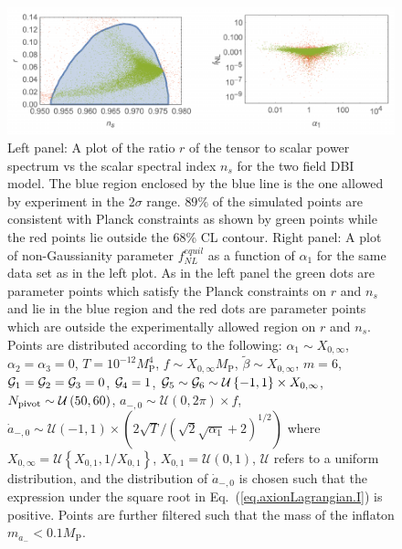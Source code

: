 \documentclass[a4paper,11pt]{article}
\begin{document}
  \begin{figure}
    \centering
    \includegraphics[width=1.0\textwidth]{figs/fig1.pdf}
    \caption{Left panel: A plot of the ratio $r$ of the tensor to scalar power spectrum vs the
      scalar spectral index $n_s$ for the two field DBI model.
      The blue region enclosed by the blue line is the one allowed by experiment in the 2$\sigma$
      range. $89\%$ of the simulated points are consistent with Planck constraints as shown by green
      points while the red points lie outside the 68\% CL contour.
          Right panel: A plot of non-Gaussianity parameter $f^{equil}_{NL}$ as
      a function of $\alpha_1$ for the same data set as in the left plot. As in the left panel
      the green dots are parameter points which satisfy the Planck constraints
      on $r$ and $n_s$ and lie in the blue region and the red dots are parameter points which are
      outside the experimentally allowed region on $r$ and $n_s$.
          Points are distributed according to the following:
      $\alpha_1 \sim X_{0, \infty}$, $\alpha_2 = \alpha_3 = 0$,
      $T = 10^{-12} M_\text{P}^4$,
      $f \sim X_{0, \infty} M_\text{P}$,
      $\tilde\beta \sim X_{0, \infty}$,
      $m = 6$, %
      ${\cal{G}}_1 = {\cal{G}}_2 = {\cal{G}}_3 = 0$, ${\cal{G}}_4 = 1$,
      ${\cal{G}}_5 \sim {\cal{G}}_6 \sim \mathcal{U}\left\{-1, 1\right\} \times X_{0, \infty}$,
      $N_{\rm pivot} \sim \mathcal{U}\left(50, 60\right)$,
      $a_{-, 0} \sim \mathcal{U}\left(0, 2\pi\right) \times f$,
      $\dot a_{-, 0} \sim \mathcal{U}\left(-1, 1\right)
          \times \left(2 \sqrt{T}/\left(\sqrt{2} \sqrt{\alpha_1} + 2\right)^{1/2}\right)$
      where $X_{0, \infty} = \mathcal{U}\left\{X_{0, 1}, 1 / X_{0, 1}\right\}$,
      $X_{0, 1} = \mathcal{U}\left(0, 1\right)$, $\mathcal{U}$ refers to a uniform distribution,
      and the distribution of $\dot a_{-, 0}$ is chosen such that the expression under the
      square root in Eq.~(\ref{eq.axionLagrangian.I}) is positive.
      Points are further filtered such that the mass of the inflaton $m_{a_-} < 0.1 M_\text{P}$.}
    \label{fig1}
  \end{figure}
\end{document}
